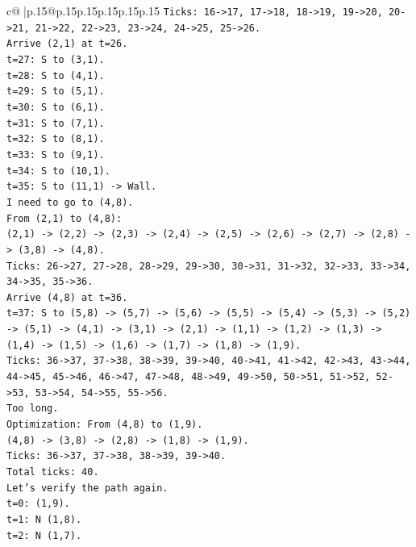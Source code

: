 \documentclass{article}
\begin{document}
{\begin{supertabular}{c@{$\;$}|p{.15\linewidth}@{}p{.15\linewidth}p{.15\linewidth}p{.15\linewidth}p{.15\linewidth}p{.15\linewidth}}
{{{\texttt{Ticks: 16{-}>17, 17{-}>18, 18{-}>19, 19{-}>20, 20{-}>21, 21{-}>22, 22{-}>23, 23{-}>24, 24{-}>25, 25{-}>26.} \\
\texttt{Arrive (2,1) at t=26.} \\
\texttt{t=27: S to (3,1).} \\
\texttt{t=28: S to (4,1).} \\
\texttt{t=29: S to (5,1).} \\
\texttt{t=30: S to (6,1).} \\
\texttt{t=31: S to (7,1).} \\
\texttt{t=32: S to (8,1).} \\
\texttt{t=33: S to (9,1).} \\
\texttt{t=34: S to (10,1).} \\
\texttt{t=35: S to (11,1) {-}> Wall.} \\
\texttt{I need to go to (4,8).} \\
\texttt{From (2,1) to (4,8):} \\
\texttt{(2,1) {-}> (2,2) {-}> (2,3) {-}> (2,4) {-}> (2,5) {-}> (2,6) {-}> (2,7) {-}> (2,8) {-}> (3,8) {-}> (4,8).} \\
\texttt{Ticks: 26{-}>27, 27{-}>28, 28{-}>29, 29{-}>30, 30{-}>31, 31{-}>32, 32{-}>33, 33{-}>34, 34{-}>35, 35{-}>36.} \\
\texttt{Arrive (4,8) at t=36.} \\
\texttt{t=37: S to (5,8) {-}> (5,7) {-}> (5,6) {-}> (5,5) {-}> (5,4) {-}> (5,3) {-}> (5,2) {-}> (5,1) {-}> (4,1) {-}> (3,1) {-}> (2,1) {-}> (1,1) {-}> (1,2) {-}> (1,3) {-}> (1,4) {-}> (1,5) {-}> (1,6) {-}> (1,7) {-}> (1,8) {-}> (1,9).} \\
\texttt{Ticks: 36{-}>37, 37{-}>38, 38{-}>39, 39{-}>40, 40{-}>41, 41{-}>42, 42{-}>43, 43{-}>44, 44{-}>45, 45{-}>46, 46{-}>47, 47{-}>48, 48{-}>49, 49{-}>50, 50{-}>51, 51{-}>52, 52{-}>53, 53{-}>54, 54{-}>55, 55{-}>56.} \\
\texttt{Too long.} \\
\texttt{Optimization: From (4,8) to (1,9).} \\
\texttt{(4,8) {-}> (3,8) {-}> (2,8) {-}> (1,8) {-}> (1,9).} \\
\texttt{Ticks: 36{-}>37, 37{-}>38, 38{-}>39, 39{-}>40.} \\
\texttt{Total ticks: 40.} \\
\texttt{Let's verify the path again.} \\
\texttt{t=0: (1,9).} \\
\texttt{t=1: N (1,8).} \\
\texttt{t=2: N (1,7).} \\
}}}
\end{supertabular}}
\end{document}
